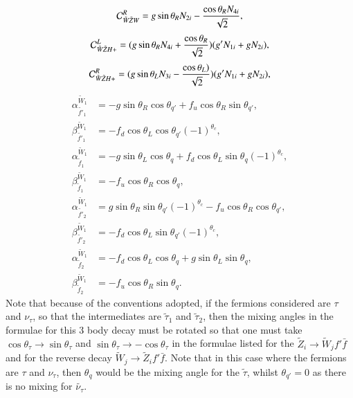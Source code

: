 \documentclass[final,3p,times]{elsarticle}
\begin{document}
\begin{equation}
\mathcal{C}_{\tilde{W} \tilde{Z} W}^R = g\sin\theta_R N_{2i} - {\cos\theta_R N_{4i} \over \sqrt{2}},
\end{equation}
\begin{equation}
\mathcal{C}_{\tilde{W} \tilde{Z} H+}^L = (g\sin\theta_R N_{4i} + {\cos\theta_R \over \sqrt{2}})(g' N_{1i} + g N_{2i}),
\end{equation}
\begin{equation}
\mathcal{C}_{\tilde{W} \tilde{Z} H+}^R = (g\sin\theta_L N_{3i} - {\cos\theta_L) \over \sqrt{2}})(g' N_{1i} + g N_{2i}),
\end{equation}
\begin{align}
\alpha_{\tilde{f'}_1}^{\tilde{W}_1} &= -g \sin\theta_R \cos\theta_{q'} + f_{u}\cos\theta_{R}\sin\theta_{q'}, \\
\beta_{\tilde{f'}_1}^{\tilde{W}_1} &= -f_{d}\cos\theta_L \cos\theta_{q'} (-1)^{\theta_c}, \\
\alpha_{\tilde{f}_1}^{\tilde{W}_1} &= -g\sin\theta_L \cos\theta_q + f_{d}\cos\theta_L \sin\theta_q(-1)^{\theta_c}, \\
\beta_{\tilde{f}_1}^{\tilde{W}_1} &= -f_{u}\cos\theta_R \cos\theta_q, \\
\alpha_{\tilde{f'}_2}^{\tilde{W}_1} &= g\sin\theta_R \sin\theta_{q'}(-1)^{\theta_c} - f_{u}\cos\theta_R \cos\theta_{q'}, \\
\beta_{\tilde{f'}_2}^{\tilde{W}_1} &= -f_{d}\cos\theta_L \sin\theta_{q'}(-1)^{\theta_c}, \\
\alpha_{\tilde{f}_2}^{\tilde{W}_1} &= -f_{d}\cos\theta_{L}\cos\theta_{q} + g\sin\theta_{L}\sin\theta_{q}, \\
\beta_{\tilde{f}_2}^{\tilde{W}_1} &= -f_{u}\cos\theta_R\sin\theta_{q}.
\end{align}
Note that because of the conventions adopted, if the fermions considered are $\tau$ and $\nu_{\tau}$, so that the intermediates are $\tilde{\tau}_1$ and $\tilde{\tau}_2$, then the mixing angles in the formulae for this 3 body	 decay must be rotated so that one must take $\cos\theta_{\tau} \rightarrow \sin\theta_{\tau}$ and $\sin\theta_{\tau} \rightarrow -\cos\theta_{\tau}$ in the formulae listed for the $\tilde{Z}_i \rightarrow \tilde{W}_j  f' \bar{f}$ and for the reverse decay $\tilde{W}_j \rightarrow \tilde{Z}_i  f' \bar{f}$. Note that in this case where the fermions are $\tau$ and $\nu_{\tau}$, then $\theta_q$ would be the mixing angle for the $\tilde{\tau}$, whilst $\theta_{q'} = 0$ as there is no mixing for $\tilde{\nu_{\tau}}$.
\end{document}
